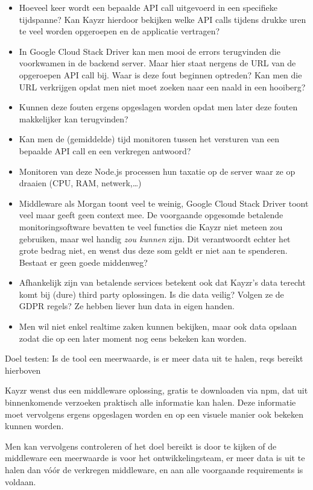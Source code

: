 \begin{itemize}
	\item Hoeveel keer wordt een bepaalde API call uitgevoerd in een specifieke tijdspanne? Kan Kayzr hierdoor bekijken welke API calls tijdens drukke uren te veel worden opgeroepen en de applicatie vertragen?
	\item In Google Cloud Stack Driver kan men mooi de errors terugvinden die voorkwamen in de backend server. Maar hier staat nergens de URL van de opgeroepen API call bij. Waar is deze fout beginnen optreden? Kan men die URL verkrijgen opdat men niet moet zoeken naar een naald in een hooiberg?
	\item Kunnen deze fouten ergens opgeslagen worden opdat men later deze fouten makkelijker kan terugvinden?
	\item Kan men de (gemiddelde) tijd monitoren tussen het versturen van een bepaalde API call en een verkregen antwoord?
	\item Monitoren van deze Node.js processen hun taxatie op de server waar ze op draaien (CPU, RAM, netwerk,…)
	\item Middleware als Morgan toont veel te weinig, Google Cloud Stack Driver toont veel maar geeft geen context mee. De voorgaande opgesomde betalende monitoringsoftware bevatten te veel functies die Kayzr niet meteen zou gebruiken, maar wel handig \textit{zou kunnen} zijn. Dit verantwoordt echter het grote bedrag niet, en wenst dus deze som geldt er niet aan te spenderen. Bestaat er geen goede middenweg?
	\item Afhankelijk zijn van betalende services betekent ook dat Kayzr's data terecht komt bij (dure) third party oplossingen. Is die data veilig? Volgen ze de GDPR regels? Ze hebben liever hun data in eigen handen.
	\item Men wil niet enkel realtime zaken kunnen bekijken, maar ook data opslaan zodat die op een later moment nog eens bekeken kan worden.
\end{itemize}

Doel testen: Is de tool een meerwaarde, is er meer data uit te halen, reqs bereikt hierboven

Kayzr wenst dus een middleware oplossing, gratis te downloaden via npm, dat uit binnenkomende verzoeken praktisch alle informatie kan halen. Deze informatie moet vervolgens ergens opgeslagen worden en op een visuele manier ook bekeken kunnen worden. 

Men kan vervolgens controleren of het doel bereikt is door te kijken of de middleware een meerwaarde is voor het ontwikkelingsteam, er meer data is uit te halen dan vóór de verkregen middleware, en aan alle voorgaande requirements is voldaan.



 






 
